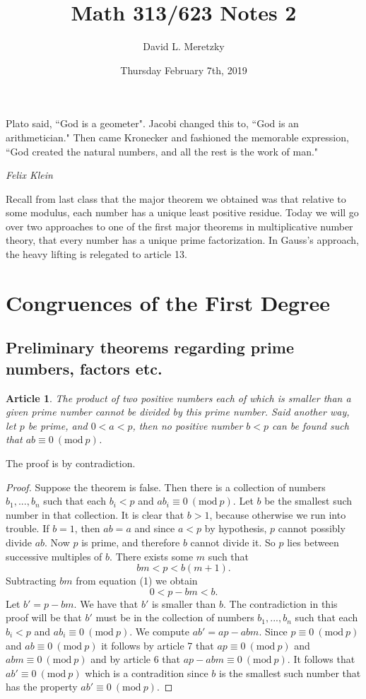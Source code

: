 \documentclass{article}
\title{ \vspace{-10ex} %
Math 313/623 Notes 2
}
\author{David L. Meretzky
}
\date{%
Thursday February 7th, 2019
}
\theoremstyle{problemstyle}
\newtheorem{article}{Article}
\newcommand{\Mod}[1]{\ (\mathrm{mod}\ #1)}
\begin{document}
\maketitle

\epigraph{Plato said, ``God is a geometer". Jacobi changed this to, ``God is an arithmetician." Then came Kronecker and fashioned the memorable expression, ``God created the natural numbers, and all the rest is the work of man."}{\textit{Felix Klein}}

Recall from last class that the major theorem we obtained was that relative to some modulus, each number has a unique least positive residue. Today we will go over two approaches to one of the first major theorems in multiplicative number theory, that every number has a unique prime factorization. In Gauss's approach, the heavy lifting is relegated to article 13.

\setcounter{section}{1}
\section{Congruences of the First Degree}

\setcounter{article}{12}

\subsection{Preliminary theorems regarding prime numbers, factors etc.}

\begin{article}
The product of two positive numbers each of which is smaller than a given prime number cannot be divided by this prime number.  Said another way, let $p$ be prime, and $0<a<p$, then no positive number $b<p$ can be found such that $ab \equiv 0 \Mod{p}$.  
\end{article}

The proof is by contradiction. 

\begin{proof}
Suppose the theorem is false. Then there is a collection of numbers $b_1,...,b_n$ such that each $b_i < p$ and $ab_i \equiv 0 \Mod{p}$. Let $b$ be the smallest such number in that collection. It is clear that $b >1$, because otherwise we run into trouble. If $b = 1$, then $ab = a$ and since $a < p$ by hypothesis, $p$ cannot possibly divide $ab$. Now $p$ is prime, and therefore $b$ cannot divide it. So $p$ lies between successive multiples of $b$.   There exists some $m$ such that \begin{equation}bm < p < b(m+1).\end{equation} Subtracting $bm$ from equation (1) we obtain  $$0 < p-bm < b.$$ Let $b' = p-bm$. We have that $b'$ is smaller than $b$. The contradiction in this proof will be that $b'$ must be in the collection of numbers $b_1,...,b_n$ such that each $b_i < p$ and $ab_i \equiv 0 \Mod{p}$. We compute $ab' = ap-abm$. Since $p \equiv 0 \Mod{p}$ and $ab \equiv 0 \Mod{p}$ it follows by article 7 that $ap \equiv 0 \Mod{p}$ and $abm \equiv 0 \Mod{p}$ and by article 6 that $ap-abm \equiv 0 \Mod{p}$. It follows that $ab' \equiv 0 \Mod{p}$ which is a contradition since $b$ is the smallest such number that has the property $ab' \equiv 0 \Mod{p}$. 
\end{proof}
\end{document}
